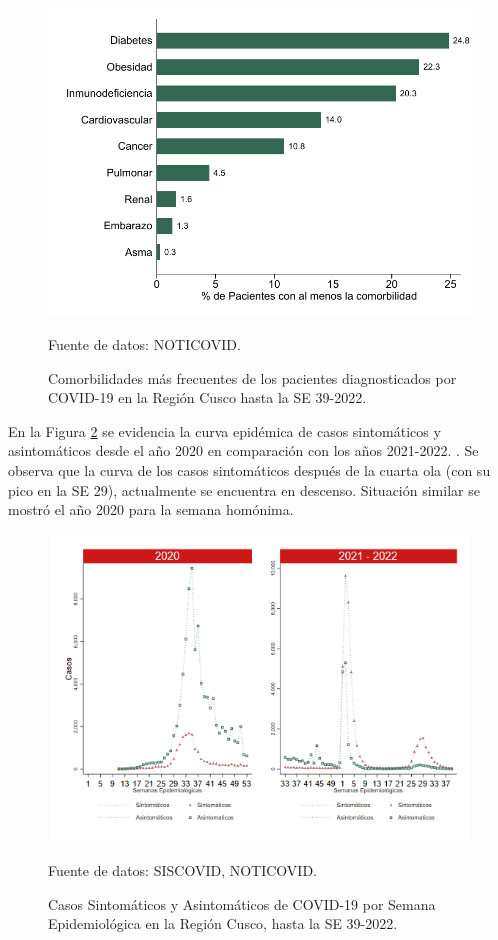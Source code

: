 \documentclass[12pt,a4paper,openany]{book}
\begin{document}
	\begin{figure}[h]
				\caption{Comorbilidades más frecuentes de los pacientes diagnosticados por COVID-19 en la Región Cusco hasta la SE 39-2022. }\label{fig:comorbilidades}
		\begin{center}
			\includegraphics[width=0.65\linewidth]{../figuras/figura_comorbilidad.pdf}
		\end{center}
		{\footnotesize {Fuente de datos: NOTICOVID.}}
	\end{figure}
	\clearpage
	En la Figura \ref{fig:sintomaticos_asintomati} se evidencia la curva epidémica de casos sintomáticos y asintomáticos desde el año 2020 en comparación con los años 2021-2022. . Se observa que la curva de los casos sintomáticos
	después de la cuarta ola (con su pico en la SE 29), actualmente se encuentra en descenso. Situación similar se mostró el año 2020 para la semana homónima.
	
	\begin{figure}[h]
		\caption{Casos Sintomáticos y Asintomáticos de COVID-19 por Semana Epidemiológica en la Región Cusco, hasta la SE 39-2022.  }\label{fig:sintomaticos_asintomati}
		
		\begin{center}
			\includegraphics[width=0.95\linewidth]{../figuras/sintomaticos_20_21_22.png}
		\end{center}
		{\footnotesize {Fuente de datos: SISCOVID, NOTICOVID.}}
	\end{figure}
	\clearpage
	
\end{document}
